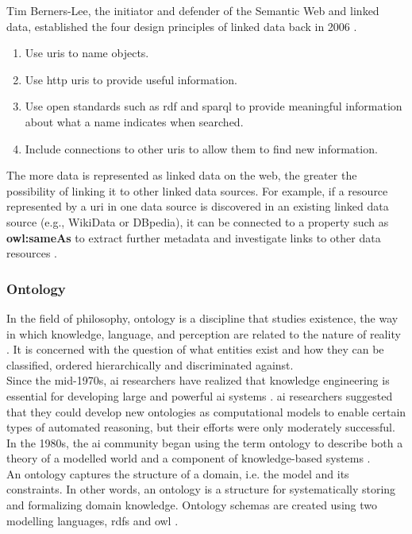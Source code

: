     Tim Berners-Lee, the initiator and defender of the Semantic Web and linked data, established the four design principles of linked data back in 2006 \cite{bizer2008linked, bizer2011linked}.
    \begin{enumerate}
        \item Use \acrshort{uri}s to name objects.
        \item Use \acrshort{http} \acrshort{uri}s to provide useful information. 
        \item Use open standards such as \acrshort{rdf} and \acrshort{sparql} to provide meaningful information about what a name indicates when searched. 
        \item Include connections to other \acrshort{uri}s to allow them to find new information. 
    \end{enumerate}

    The more data is represented as linked data on the web, the greater the possibility of linking it to other linked data sources. For example, if a resource represented by a \acrshort{uri} in one data source is discovered in an existing linked data source (e.g., WikiData or DBpedia), it can be connected to a property such as \textbf{owl:sameAs} to extract further metadata and investigate links to other data resources \cite{bizer2008linked}.\\

    \subsubsection{Ontology \label{subsubsec:ontology}}
    In the field of philosophy, ontology is a discipline that studies existence, the way in which knowledge, language, and perception are related to the nature of reality \cite{smith2012ontology}. It is concerned with the question of what entities exist and how they can be classified, ordered hierarchically and discriminated against. \\
    Since the mid-1970s, \acrshort{ai} researchers have realized that knowledge engineering is essential for developing large and powerful \acrshort{ai} systems \cite{fensel2001ontologies}. \acrshort{ai} researchers suggested that they could develop new ontologies as computational models to enable certain types of automated reasoning, but their efforts were only moderately successful. In the 1980s, the \acrshort{ai} community began using the term ontology to describe both a theory of a modelled world and a component of knowledge-based systems \cite{guarino1995formal}.\\
    An ontology captures the structure of a domain, i.e. the model and its constraints. In other words, an ontology is a structure for systematically storing and formalizing domain knowledge. Ontology schemas are created using two modelling languages, \acrfull{rdfs} and \acrfull{owl} \cite{fensel2001ontologies}.\\

